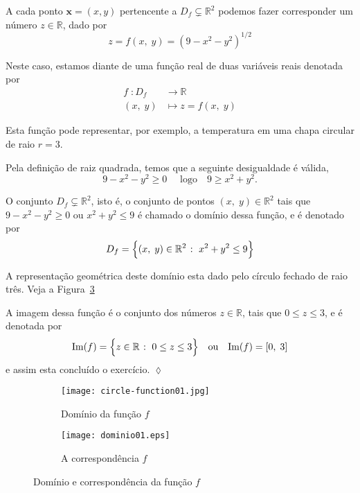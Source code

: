 \solo
A cada ponto \(\mathbf{x}=(x, y)\) pertencente a \(D_{f}\subsetneq \mathbb{R}^{2}\) podemos fazer corresponder um número \(z \in \mathbb{R}\), dado por
\begin{equation*}
	z=f(x,\;y)=(9-x^{2}-y^{2})^{1/2}
\end{equation*}

Neste caso, estamos diante de uma função real de duas variáveis reais denotada por
\begin{align*}
	f \; \colon D_{f} &\longrightarrow \mathbb{R}\\
	(x,\; y) &\longmapsto z=f(x,\; y)
\end{align*}

Esta função pode representar, por exemplo, a temperatura em uma chapa circular de raio \(r=3\). 


Pela definição de raiz quadrada, temos que a seguinte desigualdade é válida,
\begin{equation*}
	9-x^2-y^2\geq 0\quad \text{ logo}\quad 9\geq x^2+y^2.
\end{equation*}

O conjunto \(D_{f} \subsetneq \mathbb{R}^{2}\), isto é, o conjunto de pontos \((x,\;y)\in \mathbb{R}^{2}\) tais que 
\(9-x^{2}-y^{2}  \geq 0\) ou \(x^{2}+y^{2} \leq  9\) é chamado o domínio dessa função, e é denotado por
\begin{equation*}
	D_{f}=\Bigl\{(x, \; y)\in \mathbb{R}^2\; \colon\; x^2+y^2\leq 9 \Bigr\}
\end{equation*}


A representação geométrica deste domínio esta dado pelo círculo fechado de raio três. Veja a Figura~\ref{fig:dom-01} 

A imagem dessa função é o conjunto dos números \(z \in \mathbb{R}\), tais que \(0 \leq  z \leq 3\), e é denotada por
\begin{equation*}
	\mathrm{Im}(f)=\Bigl\{ z \in \mathbb{R}\;\colon\; 0 \leq z \leq 3 \Bigr\}
	\quad \text{ou} \quad \mathrm{Im}(f)=[0,\; 3]
\end{equation*}
e assim esta concluído o exercício. \hfill \(\lozenge\)
%
\begin{figure}[H]
	\centering
	\begin{subfigure}[b]{0.45\textwidth}
		\centering
		\texttt{[image: circle-function01.jpg]}
		\caption{Domínio da função \(f\)}
		\label{fig:dom-01-1}
	\end{subfigure}
	\hfill
	\begin{subfigure}[b]{0.45\textwidth}
		\centering
		\texttt{[image: dominio01.eps]}
		\caption{A correspondência $f$}
		\label{fig:dom-01-2}
	\end{subfigure}
	\caption{Domínio e correspondência da função \(f\)}
	\label{fig:dom-01}
\end{figure}
%

